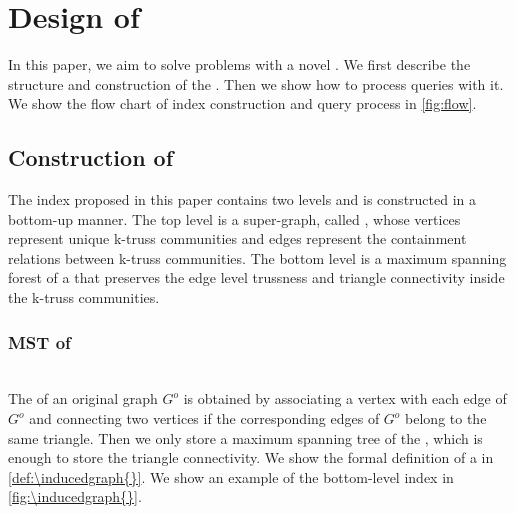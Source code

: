 \section{Design of \TwoLevelIndex{}}
\label{index}

In this paper, we aim to solve \probdef{} problems with a novel \twolevelindex{}. We first describe the structure and construction of the \twolevelindex{}. Then we show how to process queries with it. We show the flow chart of index construction and query process in \autoref{fig:flow}.

\subsection{Construction of \TwoLevelIndex{}}

The index proposed in this paper contains two levels and is constructed in a bottom-up manner. %
The top level is a super-graph, called \treeindex{}, whose vertices represent unique k-truss communities and edges represent the containment relations between k-truss communities. 
The bottom level is a maximum spanning forest of a \inducedgraph{} that preserves the edge level trussness and triangle connectivity inside the k-truss communities. 

\subsubsection{MST of \InducedGraph{}}
\label{bottom-level}
~\\The \inducedgraph{} of an original graph $G^o$ is obtained by associating a vertex with each edge of $G^o$ and connecting two vertices if the corresponding edges of $G^o$ belong to the same triangle. Then we only store a maximum spanning tree of the \inducedgraph{}, which is enough to store the triangle connectivity. We show the formal definition of a \inducedgraph{} in \autoref{def:\inducedgraph{}}. We show an example of the bottom-level index in \autoref{fig:\inducedgraph{}}. %

